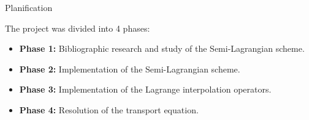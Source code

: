 \begin{frame}{Planification}
    
    The project was divided into 4 phases:
    \begin{itemize}
        \item \textbf{Phase 1:} Bibliographic research and study of the Semi-Lagrangian scheme.
        \item \textbf{Phase 2:} Implementation of the Semi-Lagrangian scheme.
        \item \textbf{Phase 3:} Implementation of the Lagrange interpolation operators.
        \item \textbf{Phase 4:} Resolution of the transport equation.
    \end{itemize}
\end{frame}